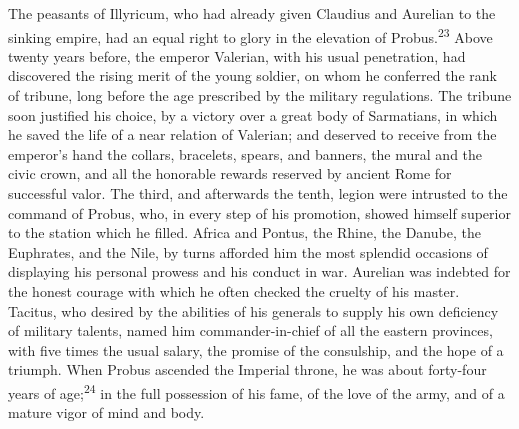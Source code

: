 The peasants of Illyricum, who had already given Claudius and
Aurelian to the sinking empire, had an equal right to glory in
the elevation of Probus.\textsuperscript{23} Above twenty years before, the
emperor Valerian, with his usual penetration, had discovered the
rising merit of the young soldier, on whom he conferred the rank
of tribune, long before the age prescribed by the military
regulations. The tribune soon justified his choice, by a victory
over a great body of Sarmatians, in which he saved the life of a
near relation of Valerian; and deserved to receive from the
emperor’s hand the collars, bracelets, spears, and banners, the
mural and the civic crown, and all the honorable rewards reserved
by ancient Rome for successful valor. The third, and afterwards
the tenth, legion were intrusted to the command of Probus, who,
in every step of his promotion, showed himself superior to the
station which he filled. Africa and Pontus, the Rhine, the
Danube, the Euphrates, and the Nile, by turns afforded him the
most splendid occasions of displaying his personal prowess and
his conduct in war. Aurelian was indebted for the honest courage
with which he often checked the cruelty of his master. Tacitus,
who desired by the abilities of his generals to supply his own
deficiency of military talents, named him commander-in-chief of
all the eastern provinces, with five times the usual salary, the
promise of the consulship, and the hope of a triumph. When Probus
ascended the Imperial throne, he was about forty-four years of
age;\textsuperscript{24} in the full possession of his fame, of the love of the
army, and of a mature vigor of mind and body.



